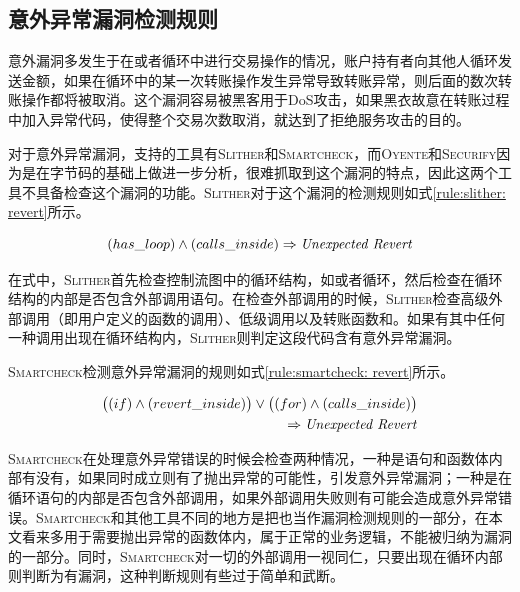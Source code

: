 \subsection{意外异常漏洞检测规则}

意外漏洞多发生于在或者循环中进行交易操作的情况，账户持有者向其他人循环发送金额，如果在循环中的某一次转账操作发生异常导致转账异常，则后面的数次转账操作都将被取消。这个漏洞容易被黑客用于DoS攻击，如果黑衣故意在转账过程中加入异常代码，使得整个交易次数取消，就达到了拒绝服务攻击的目的。

对于意外异常漏洞，支持的工具有\textsc{Slither}和\textsc{Smartcheck}，而\textsc{Oyente}和\textsc{Securify}因为是在字节码的基础上做进一步分析，很难抓取到这个漏洞的特点，因此这两个工具不具备检查这个漏洞的功能。\textsc{Slither}对于这个漏洞的检测规则如式\ref{rule:slither: revert}所示。
\begin{mdframed}[
	linewidth = 1pt,
	innertopmargin = -5pt,
	innerbottommargin = 3pt,
	outerlinewidth = 1pt
	]
    \small
	\begin{equation} \label{rule:slither: revert}
    (has\_loop) \wedge (calls\_inside) \Rightarrow \text{\emph{Unexpected Revert}}
	\end{equation}
\end{mdframed}

在式中，\textsc{Slither}首先检查控制流图中的循环结构，如或者循环，然后检查在循环结构的内部是否包含外部调用语句。在检查外部调用的时候，\textsc{Slither}检查高级外部调用（即用户定义的函数的调用）、低级调用以及转账函数和。如果有其中任何一种调用出现在循环结构内，\textsc{Slither}则判定这段代码含有意外异常漏洞。

\textsc{Smartcheck}检测意外异常漏洞的规则如式\ref{rule:smartcheck: revert}所示。
\begin{mdframed}[
	linewidth = 1pt,
	innertopmargin = -5pt,
	innerbottommargin = 3pt,
	outerlinewidth = 1pt
	]
    \small
	\begin{equation} \label{rule:smartcheck: revert}
    \begin{split}
       \big ((if) \wedge (revert\_inside)\big ) \vee \big ((for) \wedge (calls\_inside)\big ) \\
       \Rightarrow \text{\emph{Unexpected Revert}}
    \end{split}
	\end{equation}
\end{mdframed}
\textsc{Smartcheck}在处理意外异常错误的时候会检查两种情况，一种是语句和函数体内部有没有，如果同时成立则有了抛出异常的可能性，引发意外异常漏洞；一种是在循环语句的内部是否包含外部调用，如果外部调用失败则有可能会造成意外异常错误。\textsc{Smartcheck}和其他工具不同的地方是把也当作漏洞检测规则的一部分，在本文看来多用于需要抛出异常的函数体内，属于正常的业务逻辑，不能被归纳为漏洞的一部分。同时，\textsc{Smartcheck}对一切的外部调用一视同仁，只要出现在循环内部则判断为有漏洞，这种判断规则有些过于简单和武断。

